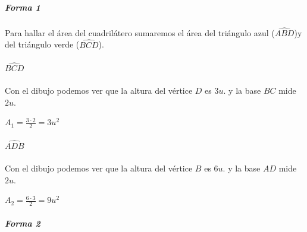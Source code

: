 \documentclass[palatino,nosec,nochap,nobuilddate]{Docencia}
\begin{document}
\begin{problem}[111]
\subparagraph{Forma 1}
Para hallar el área del cuadrilátero sumaremos el área del triángulo azul ($\hat{ABD}$)y del triángulo verde ($\hat{BCD}$).

\paragraph{$\hat{BCD}$}

Con el dibujo podemos ver que la altura del vértice $D$ es $3u.$ y la base $BC$ mide $2u.$

$A_1 = \frac{3·2}{2} = 3u^2$

\paragraph{$\hat{ADB}$}

Con el dibujo podemos ver que la altura del vértice $B$ es $6u.$ y la base $AD$ mide $2u.$

$A_2 = \frac{6·3}{2} = 9u^2$

\subparagraph{Forma 2}





\end{problem}
\end{document}
